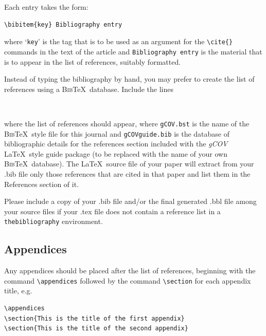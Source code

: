 \documentclass{gCOV2e}
\theoremstyle{plain}%
\theoremstyle{definition}
\theoremstyle{remark}
\begin{document}
\bigskip
\noindent Each entry takes the form:
\begin{verbatim}
\bibitem{key} Bibliography entry
\end{verbatim}
where `\texttt{key}' is the tag that is to be used as an argument for the \verb"\cite{}" commands in the text of the article and \texttt{Bibliography entry} is the material that is to appear in the list of references, suitably formatted.

Instead of typing the bibliography by hand, you may prefer to create the list of references using a \textsc{Bib}\TeX\ database. Include the lines
\begin{verbatim}


\end{verbatim}
where the list of references should appear, where \texttt{gCOV.bst} is the name of the \textsc{Bib}\TeX\ style file for this journal and \texttt{gCOVguide.bib} is the database of bibliographic details for the references section included with the \textit{gCOV} \LaTeX\ style guide package (to be replaced with the name of your own \textsc{Bib}\TeX\ database). The \LaTeX\ source file of your paper will extract from your .bib file only those references that are cited in that paper and list them in the References section of it.

Please include a copy of your .bib file and/or the final generated .bbl file among your source files if your .tex file does not contain a reference list in a \texttt{thebibliography} environment.


\subsection{Appendices}\label{appendices}

Any appendices should be placed after the list of references, beginning with the
command \verb"\appendices" followed by the command \verb"\section"
for each appendix title, e.g.
\begin{verbatim}
\appendices
\section{This is the title of the first appendix}
\section{This is the title of the second appendix}
\end{verbatim}
\end{document}
